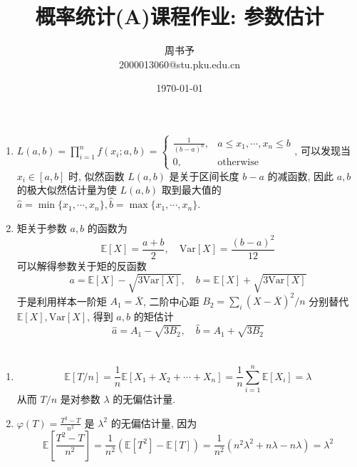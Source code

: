 \documentclass[8pt]{article}
\title{\heiti\zihao{2} 概率统计(A)课程作业: 参数估计}
\author{\kaishu\zihao{-3} 周书予\\2000013060@stu.pku.edu.cn}
\date{\today}
\theoremstyle{compact}
\def\le{\leqslant}
\def\E#1{\mathbb{E}\left[{#1}\right]}
\def\Var#1{\text{Var}\left[{#1}\right]}
\begin{document}
\pagestyle{plain}

\maketitle

\section{}
\begin{enumerate}
	\item $L(a, b) = \prod_{i=1}^{n}f(x_i; a, b) = \begin{cases}
		\frac{1}{(b - a)^n}, & a \le x_1, \cdots, x_n \le b \\
		0, & \text{otherwise}
	\end{cases}$, 可以发现当 $x_i \in [a, b]$ 时, 似然函数 $L(a, b)$ 是关于区间长度 $b - a$ 的减函数, 因此 $a, b$ 的极大似然估计量为使 $L(a, b)$ 取到最大值的 $\hat{a} = \min\{x_1, \cdots, x_n\}, \hat{b} = \max\{x_1, \cdots, x_n\}$.
	\item 矩关于参数 $a, b$ 的函数为 $$\E{X} = \frac{a+b}{2}, \quad \Var{X} = \frac{(b - a)^2}{12}$$ 可以解得参数关于矩的反函数 $$a = \E{X} - \sqrt{3\Var{X}}, \quad b = \E{X} + \sqrt{3\Var{X}}$$ 于是利用样本一阶矩 $A_1 = \overline{X}$, 二阶中心距 $B_2 = \sum_i (X - \overline{X})^2 / n$ 分别替代 $\E{X}, \Var{X}$, 得到 $a, b$ 的矩估计 $$\hat{a} = A_1 - \sqrt{3B_2}, \quad \hat{b} = A_1 + \sqrt{3B_2}$$
\end{enumerate}

\section{}
\begin{enumerate}
	\item $$\E{T/n} = \frac1n \E{X_1 + X_2 + \cdots + X_n} = \frac1n \sum_{i=1}^{n}\E{X_i} = \lambda$$ 从而 $T/n$ 是对参数 $\lambda$ 的无偏估计量.
 \item $\varphi(T) = \frac{T^2-T}{n^2}$ 是 $\lambda^2$ 的无偏估计量, 因为 $$\E{\frac{T^2-T}{n^2}} = \frac 1{n^2}\left(\E{T^2} - \E{T}\right) = \frac1{n^2}\left(n^2\lambda^2 + n\lambda - n\lambda \right) = \lambda^2$$
\end{enumerate}
\end{document}
